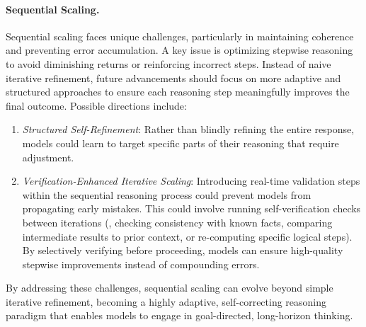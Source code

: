 \paragraph{Sequential Scaling.} Sequential scaling faces unique challenges, particularly in maintaining coherence and preventing error accumulation. A key issue is optimizing stepwise reasoning to avoid diminishing returns or reinforcing incorrect steps. Instead of naive iterative refinement, future advancements should focus on more adaptive and structured approaches to ensure each reasoning step meaningfully improves the final outcome. Possible directions include: 
\begin{enumerate}
    \item \textit{Structured Self-Refinement}: Rather than blindly refining the entire response, models could learn to target specific parts of their reasoning that require adjustment. 
    \item \textit{Verification-Enhanced Iterative Scaling}: Introducing real-time validation steps within the sequential reasoning process could prevent models from propagating early mistakes. This could involve running self-verification checks between iterations (\eg, checking consistency with known facts, comparing intermediate results to prior context, or re-computing specific logical steps). By selectively verifying before proceeding, models can ensure high-quality stepwise improvements instead of compounding errors.
\end{enumerate}
By addressing these challenges, sequential scaling can evolve beyond simple iterative refinement, becoming a highly adaptive, self-correcting reasoning paradigm that enables models to engage in goal-directed, long-horizon thinking.

